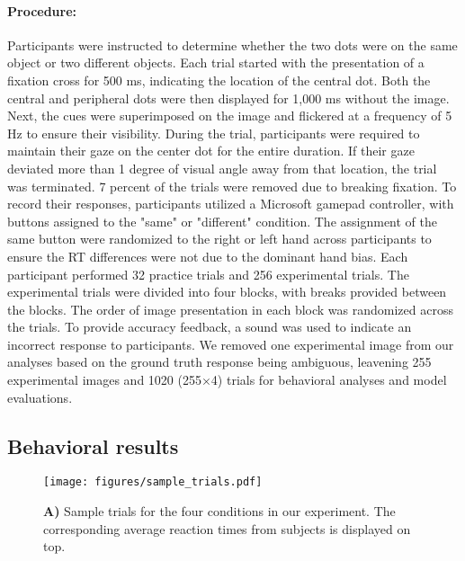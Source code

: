 \documentclass{article}
\begin{document}
\paragraph{Procedure:}
Participants were instructed to determine whether the two dots were on the same object or two different objects. Each trial started with the presentation of a fixation cross for 500 ms, indicating the location of the central dot. Both the central and peripheral dots were then displayed for 1,000 ms without the image. Next, the cues were superimposed on the image and flickered at a frequency of 5 Hz to ensure their visibility. During the trial, participants were required to maintain their gaze on the center dot for the entire duration. If their gaze deviated more than 1 degree of visual angle away from that location, the trial was terminated. 7 percent of the trials were removed due to breaking fixation. To record their responses, participants utilized a Microsoft gamepad controller, with buttons assigned to the "same" or "different" condition. The assignment of the same button were randomized to the right or left hand across participants to ensure the RT differences were not due to the dominant hand bias. Each participant performed 32 practice trials and 256 experimental trials. The experimental trials were divided into four blocks, with breaks provided between the blocks. The order of image presentation in each block was randomized across the trials. To provide accuracy feedback, a sound was used to indicate an incorrect response to participants. We removed one experimental image from our analyses based on the ground truth response being ambiguous, leavening 255 experimental images and 1020 (255$\times$4) trials for behavioral analyses and model evaluations.  


\subsection{Behavioral results}

\begin{figure}[ht]
\begin{center}
\texttt{[image: figures/sample\_trials.pdf]}
\end{center}
\caption{\textbf{A)} Sample trials for the four conditions in our experiment. The corresponding average reaction times from subjects is displayed on top.} %
\label{fig:sample_trials}
\end{figure}
\end{document}
